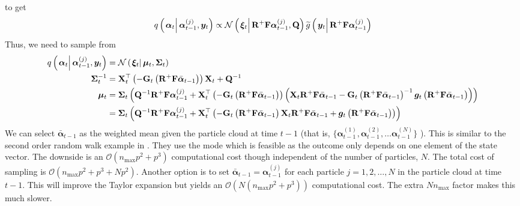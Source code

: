 \documentclass[9pt, notitlepage]{article}
\renewcommand{\vec}[1]{\bm{#1}}
\newcommand{\vecb}[1]{\bar{\vec{#1}}}
\newcommand{\mat}[1]{\mathbf{#1}}
\newcommand{\Lparen}[1]{\left( #1\right)}
\newcommand{\Cond}[2]{\left. #1 \vphantom{#2} \right\vert  #2}
\newcommand{\optor}[2]{#1\Lparen{#2}}
\newcommand{\optorC}[3]{\optor{#1}{\Cond{#2}{#3}}}
\newcommand{\normalC}[3]{\optorC{\mathcal{N}}{#1}{#2,#3}}
\newcommand{\IDC}[2]{\optorC{q}{#1}{#2}}
\newcommand{\partic}[3]{#1_{#2}^{\Lparen{#3}}}
\newcommand{\bigO}[1]{\mathcal{O}\Lparen{#1}}
\newcommand{\dimState}{p}
\newcommand{\nPart}{N}
\newcommand{\nMax}{n_{\text{max}}}
\begin{document}
%
%
to get%
%
\begin{equation}
	\IDC{\vec{\alpha}_t}{\partic{\vec{\alpha}}{t-1}{j}, \vec{y}_t} \propto %
		\normalC{\vec{\xi}_t}{\mat{R}^{+}\mat{F}\partic{\vec{\alpha}}{t-1}{j}}{\mat{Q}}
		\optorC{\widetilde{g}}{\vec{y}_t}{\mat{R}^{+}\mat{F}\partic{\vec{\alpha}}{t-1}{j}}
\end{equation}
%
%
Thus, we need to sample from%
%
{\scriptsize %
\begin{equation}\label{eqn:TaylorProposalForward}\begin{split}
	\IDC{\vec{\alpha}_t}{\partic{\vec{\alpha}}{t-1}{j}, \vec{y}_t} &=  %
		\normalC{\vec{\xi}_t}{\vec{\mu}_t}{\mat{\Sigma}_t} \\
%
	\mat{\Sigma}_t^{-1} &= \mat{X}_t^\top
		\Lparen{-\mat{G}_t\Lparen{\mat{R}^{+}\mat{F}\vecb{\alpha}_{t - 1}}}
		\mat{X}_t + \mat{Q}^{-1}  \\
%
	\vec{\mu}_t &= \mat{\Sigma}_t\Lparen{
		\mat{Q}^{-1}\mat{R}^{+}\mat{F}\partic{\vec{\alpha}}{t-1}{j} +
		\mat{X}_t^\top \Lparen{-\mat{G}_t\Lparen{\mat{R}^{+}\mat{F}\vecb{\alpha}_{t - 1}}}
		\Lparen{
			\mat{X}_t\mat{R}^{+}\mat{F}\vecb{\alpha}_{t - 1} -
			\mat{G}_t\Lparen{\mat{R}^{+}\mat{F}\vecb{\alpha}_{t - 1}}^{-1}
			\vec{g}_t\Lparen{\mat{R}^{+}\mat{F}\vecb{\alpha}_{t - 1}}
		}
	} \\
%
	 &= \mat{\Sigma}_t\Lparen{
		\mat{Q}^{-1}\mat{R}^{+}\mat{F}\partic{\vec{\alpha}}{t-1}{j} +
		\mat{X}_t^\top
		\Lparen{
			-\mat{G}_t\Lparen{\mat{R}^{+}\mat{F}\vecb{\alpha}_{t - 1}}
			\mat{X}_t\mat{R}^{+}\mat{F}\vecb{\alpha}_{t - 1} +
			\vec{g}_t\Lparen{\mat{R}^{+}\mat{F}\vecb{\alpha}_{t - 1}}
		}
	}
\end{split}\end{equation}
}%
%
%
We can select  $\vecb{\alpha}_{t - 1}$ as the weighted mean given the particle cloud at time $t-1$ (that is, %
$\{\partic{\vec{\alpha}}{t-1}{1}, \partic{\vec{\alpha}}{t-1}{2}, \dots \partic{\vec{\alpha}}{t-1}{\nPart}\}$%
). This is similar to the second order random walk example in \cite{fearnhead10}. They use the mode which is feasible as the outcome only depends on one element of the state vector. The downside is an $\bigO{\nMax \dimState^2+\dimState^3}$ computational cost though independent of the number of particles, $\nPart$. The total cost of sampling is $\bigO{\nMax\dimState^2+\dimState^3 + \nPart\dimState^2}$. Another option is to set $\vecb{\alpha}_{t - 1} = \partic{\vec{\alpha}}{t-1}{j}$ for each particle $j = 1, 2, \dots, \nPart$ in the particle cloud at time $t - 1$. This will improve the Taylor expansion but yields an $\bigO{\nPart\Lparen{\nMax\dimState^2+\dimState^3}}$ computational cost. The extra $\nPart\nMax$ factor makes this much slower.
\end{document}
